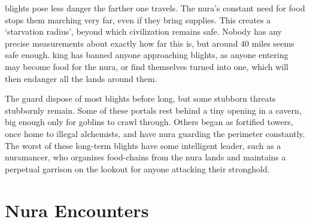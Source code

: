 \begin{multicols}{2}
\Glspl{blight} pose less danger the farther one travels.
The nura's constant need for food stops them marching very far, even if they bring supplies.
This creates a `starvation radius', beyond which civilization remains safe.
Nobody has any precise measurements about exactly how far this is, but around 40 miles seems safe enough.
\Gls{king} has banned anyone approaching \glspl{blight}, as anyone entering may become food for the nura, or find themselves turned into one, which will then endanger all the lands around them.

The \gls{guard} dispose of most \glspl{blight} before long, but some stubborn threats stubbornly remain.
Some of these portals rest behind a tiny opening in a cavern, big enough only for goblins to crawl through.
Others began as fortified towers, once home to illegal alchemists, and have nura guarding the perimeter constantly.
The worst of these long-term \glspl{blight} have some intelligent leader, such as a nuramancer, who organizes food-chains from the nura lands and maintains a perpetual garrison on the lookout for anyone attacking their stronghold.

\end{multicols}

\encNura
{}

\section{Nura Encounters}


